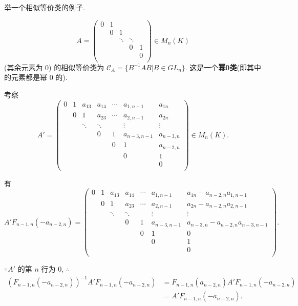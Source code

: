 \documentclass[color=black,device=normal,lang=cn,mode=geye]{elegantnote}
\begin{document}
举一个相似等价类的例子.
\begin{example}
    \[A=\begin{pmatrix}
        0 & 1 \\
        & 0 & 1 \\
        && \ddots & \ddots \\
        &&& 0 & 1 \\
        &&&& 0 \\
    \end{pmatrix}\in M_n(K)\]
    (其余元素为 $0$) 的相似等价类为 $\mathcal{C}_A=\{B^{-1}AB|B\in GL_n\}$. 这是一个\textbf{幂0类}(即其中的元素都是幂 $0$ 的).

    考察
    \[A'=\begin{pmatrix}
        0 & 1 & a_{13} & a_{14} & \cdots & a_{1,n-1} & a_{1n} \\
        & 0 & 1 & a_{23} & \cdots & a_{2,n-1} & a_{2n} \\
        && \ddots & \ddots && \vdots & \vdots \\
        &&& 0 & 1 & a_{n-3,n-1} & a_{n-3,n} \\
        &&&& 0 & 1 & a_{n-2,n} \\
        &&&&& 0 & 1 \\
        &&&&&& 0 \\
    \end{pmatrix}\in M_n(K).\]

    有
    \[A'F_{n-1,n}(-a_{n-2,n})=\begin{pmatrix}
        0 & 1 & a_{13} & a_{14} & \cdots & a_{1,n-1} & a_{1n}-a_{n-2,n}a_{1,n-1} \\
        & 0 & 1 & a_{23} & \cdots & a_{2,n-1} & a_{2n}-a_{n-2,n}a_{2,n-1} \\
        && \ddots & \ddots && \vdots & \vdots \\
        &&& 0 & 1 & a_{n-3,n-1} & a_{n-3,n}-a_{n-2,n}a_{n-3,n-1} \\
        &&&& 0 & 1 & 0 \\
        &&&&& 0 & 1 \\
        &&&&&& 0 \\
    \end{pmatrix}.\]
    
    $\because A'$ 的第 $n$ 行为 $0$, $\therefore$
    \begin{align*}
        (F_{n-1,n}(-a_{n-2,n}))^{-1}A'F_{n-1,n}(-a_{n-2,n}) & =F_{n-1,n}(a_{n-2,n})A'F_{n-1,n}(-a_{n-2,n}) \\
        & =A'F_{n-1,n}(-a_{n-2,n}).
    \end{align*}


\end{example}
\end{document}
